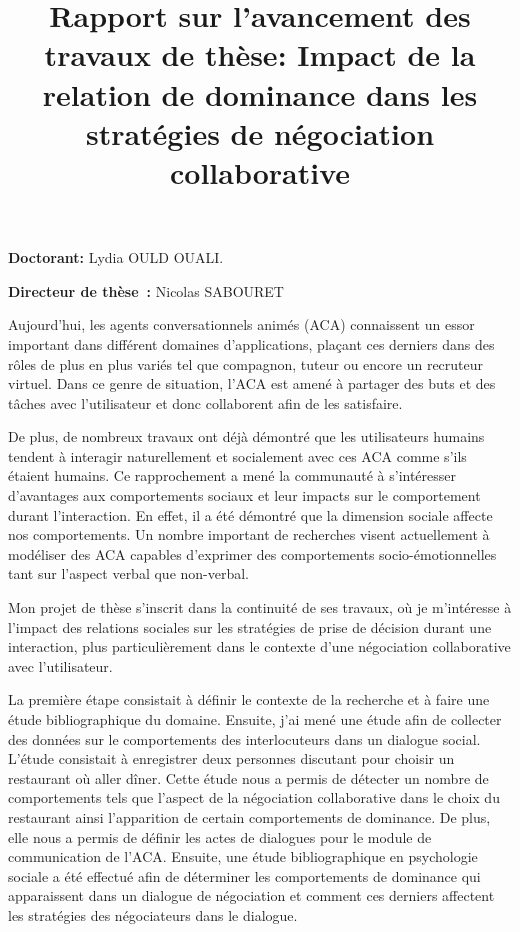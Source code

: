 \documentclass  [french] {article}
\begin{document}
		\title{\vskip -10pt Rapport sur l’avancement des travaux de thèse: Impact de la relation de dominance dans les stratégies de négociation collaborative}
				\maketitle
		
	\textbf{Doctorant:} Lydia OULD OUALI.
	\vspace{1em}


	\textbf{Directeur de thèse :} Nicolas SABOURET
	\vspace{1em}
	
	
	
	
	\par Aujourd’hui, les agents conversationnels animés (ACA) connaissent un essor important dans différent domaines d’applications, plaçant ces derniers dans des rôles de plus en plus variés tel que compagnon, tuteur  ou encore un recruteur virtuel. Dans ce genre de situation, l'ACA est amené à partager des buts et des tâches avec l'utilisateur et donc collaborent afin de les satisfaire.
	
	De plus, de nombreux travaux ont déjà démontré que les utilisateurs humains tendent à interagir naturellement et socialement avec ces ACA comme s’ils étaient humains. Ce rapprochement a mené la communauté à s'intéresser d'avantages aux comportements sociaux et leur impacts sur le comportement durant l'interaction. En effet, il a été démontré que la dimension sociale affecte nos comportements. Un nombre important de recherches visent actuellement à modéliser des ACA   capables d'exprimer des comportements socio-émotionnelles tant sur l'aspect verbal que non-verbal.
	
	Mon projet de thèse s'inscrit dans la continuité de ses travaux, où je m'intéresse à l'impact des relations sociales sur les stratégies de prise de décision durant une interaction, plus particulièrement dans le contexte d'une négociation collaborative avec l'utilisateur. 
	
	La première étape consistait à définir le contexte de la recherche et à faire une étude bibliographique du domaine. Ensuite, j'ai mené une étude afin de collecter des données sur le comportements des interlocuteurs dans un dialogue social. L'étude consistait à enregistrer deux personnes discutant pour choisir un restaurant où aller dîner. Cette étude nous a permis de détecter un nombre de comportements tels que l’aspect de la négociation collaborative dans le choix du restaurant ainsi l’apparition de certain comportements de dominance. De plus, elle nous a permis de définir les actes de dialogues pour le module de communication de l'ACA. Ensuite, une étude bibliographique en psychologie sociale a été effectué afin de déterminer les comportements de dominance qui apparaissent dans un dialogue de négociation et comment ces derniers affectent les stratégies des négociateurs dans le dialogue.
	
\end{document}
